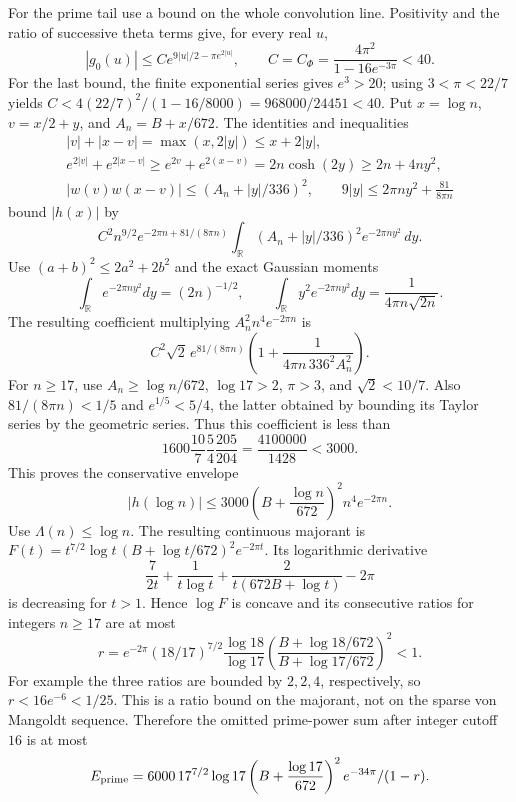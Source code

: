 For the prime tail use a bound on the whole convolution line. Positivity
and the ratio of successive theta terms give, for every real \(u\),
\[
 |g_0(u)|\le C e^{9|u|/2-\pi e^{2|u|}},\qquad
 C=C_\Phi=\frac{4\pi^2}{1-16e^{-3\pi}}<40.
\]
For the last bound, the finite exponential series gives \(e^3>20\);
using \(3<\pi<22/7\) yields
\(C<4(22/7)^2/(1-16/8000)=968000/24451<40\).
Put \(x=\log n\), \(v=x/2+y\), and \(A_n=B+x/672\).
The identities and inequalities
\[
\begin{gathered}
 |v|+|x-v|=\max(x,2|y|)\le x+2|y|,\\
 e^{2|v|}+e^{2|x-v|}
 \ge e^{2v}+e^{2(x-v)}=2n\cosh(2y)\ge2n+4ny^2,\\
 |w(v)w(x-v)|\le(A_n+|y|/336)^2,\qquad
 9|y|\le2\pi n y^2+\frac{81}{8\pi n}
\end{gathered}
\]
bound \(|h(x)|\) by
\[
C^2n^{9/2}e^{-2\pi n+81/(8\pi n)}
 \int_{\mathbb R}(A_n+|y|/336)^2e^{-2\pi n y^2}\,dy.
\]
Use \((a+b)^2\le2a^2+2b^2\) and the exact Gaussian moments
\[
 \int_{\mathbb R}e^{-2\pi n y^2}dy=(2n)^{-1/2},\qquad
 \int_{\mathbb R}y^2e^{-2\pi n y^2}dy
       =\frac1{4\pi n\sqrt{2n}}.
\]
The resulting coefficient multiplying \(A_n^2n^4e^{-2\pi n}\) is
\[
 C^2\sqrt2\,e^{81/(8\pi n)}
       \left(1+\frac1{4\pi n\,336^2A_n^2}\right).
\]
For \(n\ge17\), use \(A_n\ge\log n/672\), \(\log17>2\),
\(\pi>3\), and \(\sqrt2<10/7\).
Also \(81/(8\pi n)<1/5\) and \(e^{1/5}<5/4\), the latter obtained
by bounding its Taylor series by the geometric series.
Thus this coefficient is less than
\[
 1600\frac{10}{7}\frac54\frac{205}{204}
       =\frac{4100000}{1428}<3000.
\]
This proves the conservative envelope
\begin{equation}\label{eq:xt-prime-envelope}
 |h(\log n)|\le3000\left(B+\frac{\log n}{672}\right)^2n^4e^{-2\pi n}.
\end{equation}
Use \(\Lambda(n)\le\log n\). The resulting continuous majorant is
\(F(t)=t^{7/2}\log t\,(B+\log t/672)^2e^{-2\pi t}\).
Its logarithmic derivative
\[
 \frac7{2t}+\frac1{t\log t}
 +\frac2{t(672B+\log t)}-2\pi
\]
is decreasing for \(t>1\). Hence \(\log F\) is concave and its
consecutive ratios for integers \(n\ge17\) are at most
\[
 r=e^{-2\pi}(18/17)^{7/2}\frac{\log18}{\log17}
\left(\frac{B+\log18/672}{B+\log17/672}\right)^2<1.
\]
For example the three ratios are bounded by \(2,2,4\), respectively,
so \(r<16e^{-6}<1/25\). This is a ratio bound on the majorant, not
on the sparse von Mangoldt sequence.
Therefore the omitted prime-power sum after integer cutoff \(16\) is at most
\begin{equation}\label{eq:xt-prime-tail}
 E_{\rm prime}=6000\,17^{7/2}\log17
 \left(B+\frac{\log17}{672}\right)^2e^{-34\pi}/(1-r).
\end{equation}


